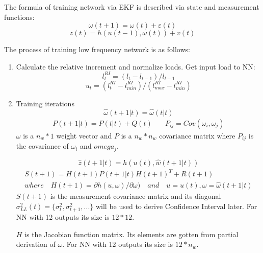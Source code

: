\documentclass[letterpaper]{article}
\begin{document}
The formula of training network via EKF is described via state and measurement functions:
\begin{equation} \omega(t+1)=\omega(t)+\varepsilon(t) \end{equation}
\begin{equation} z(t) = h(u(t-1), \omega(t)) + v(t) \end{equation}

The process of training low frequency network is as follows:
\begin{enumerate}
\item Calculate the relative increment and normalize loads. Get input load to NN: \\
  \begin{equation}l_t^{RI} = (l_t-l_{t-1})/l_{l-1}\end{equation}
  \begin{equation}u_t = (l_t^{RI}-l_{min}^{RI})/(l_{max}^{RI}-l_{min}^{RI})\end{equation}
\item Training iterations
  \begin{equation} \hat{\omega}(t+1|t) = \hat{\omega}(t|t) \end{equation}
  \begin{align}
    P(t+1|t) = P(t|t) + Q(t) & \quad P_{ij} = Cov(\omega_i, \omega_j) 
  \end{align}
  $\omega$ is a $n_w*1$ weight vector and $P$ is a $n_w*n_w$ covariance matrix where $P_{ij}$ is the covariance of $\omega_i$ and $omega_j$.

  \begin{equation} \hat{z}(t+1|t)=h(u(t), \hat{w}(t+1|t)) \end{equation}
  \begin{align} 
    S(t+1) = H(t+1)P(t+1|t)H(t+1)^T + R(t+1) \nonumber\\
    where \quad H(t+1) = \partial h(u, \omega)/ \partial \omega) \quad and \quad u=u(t), \omega = \hat{\omega}(t+1|t)
  \end{align}
  $S(t+1)$ is the measurement covariance matrix and its diagonal $\sigma_{LL}^2(t)=\{\sigma_t^2,\sigma_{t+1}^2,...\}$ will be used to derive Confidence Interval later. For NN with 12 outputs its size is $12*12$.

  $H$ is the Jacobian function matrix. Its elements are gotten from partial derivation of $\omega$. For NN with 12 outputs its size is $12*n_w$.


\end{enumerate}
\end{document}
